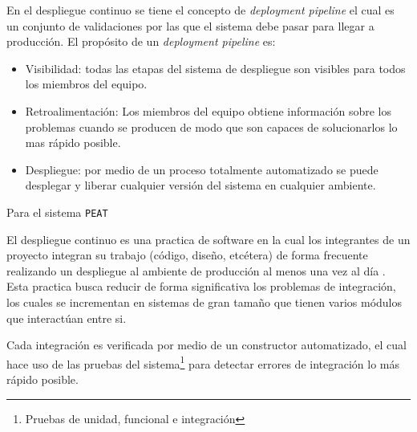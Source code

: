 En el despliegue continuo se tiene el concepto de \textit{deployment pipeline}
el cual es un conjunto de validaciones por las que el sistema debe pasar para
llegar a producción. El propósito de un \textit{deployment pipeline} es:
\begin{itemize}
\item Visibilidad: todas las etapas del sistema de despliegue son visibles
  para todos los miembros del equipo.
\item Retroalimentación: Los miembros del equipo obtiene información sobre los
  problemas cuando se producen de modo que son capaces de solucionarlos lo mas
  rápido posible.
\item Despliegue: por medio de un proceso totalmente automatizado se puede
  desplegar y liberar cualquier versión del sistema en cualquier ambiente.
\end{itemize}

Para el sistema \texttt{PEAT} 

El despliegue continuo es una practica de software en la cual los integrantes
de un proyecto integran su trabajo (código, diseño, etcétera) de forma frecuente
realizando un despliegue al ambiente de producción al menos una vez al día
\cite{26_martin_fowler_ci}. Esta practica busca reducir de forma significativa los
problemas de integración, los cuales se incrementan en sistemas de gran tamaño
que tienen varios módulos que interactúan entre si.

Cada integración es verificada por medio de un constructor automatizado, el cual
hace uso de las pruebas del sistema\footnote{Pruebas de unidad, funcional e
  integración} para detectar errores de integración lo más rápido posible.
